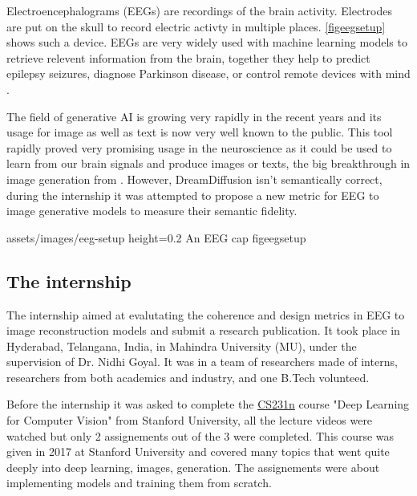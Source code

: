 Electroencephalograms (EEGs) are recordings of the brain activity. Electrodes
are put on the skull to record electric activty in multiple places.
\cref{figeegsetup} shows such a device. EEGs are very widely used with machine
learning models to retrieve relevent information from the brain, together they
help to predict epilepsy seizures, diagnose Parkinson disease, or control remote
devices with mind \parencite{sahota2023}.

The field of generative AI is growing very rapidly in the recent years and its
usage for image as well as text is now very well known to the public.  This tool
rapidly proved very promising usage in the neuroscience as it could be used to
learn from our brain signals and produce images or texts, the big breakthrough
in image generation from \cite{diffusion}. However, DreamDiffusion isn't
semantically correct, during the internship it was attempted to propose a new
metric for EEG to image generative models to measure their semantic fidelity.

\insertfigure
    {assets/images/eeg-setup}
    {height=0.2\textheight}
    {An EEG cap}
    {figeegsetup}

\subsection*{The internship}

The internship aimed at evalutating the coherence and design metrics in EEG to
image reconstruction models and submit a research publication. It took place in
Hyderabad, Telangana, India, in Mahindra University (MU), under the supervision
of Dr. Nidhi Goyal. It was in a team of researchers made of interns, researchers
from both academics and industry, and one B.Tech volunteed.

Before the internship it was asked to complete the
\href{http://cs231n.stanford.edu}{CS231n} course "Deep Learning for Computer
Vision" from Stanford University, all the lecture videos were watched but only 2
assignements out of the 3 were completed. This course was given in 2017 at
Stanford University and covered many topics that went quite deeply into deep
learning, images, generation. The assignements were about implementing models
and training them from scratch.


